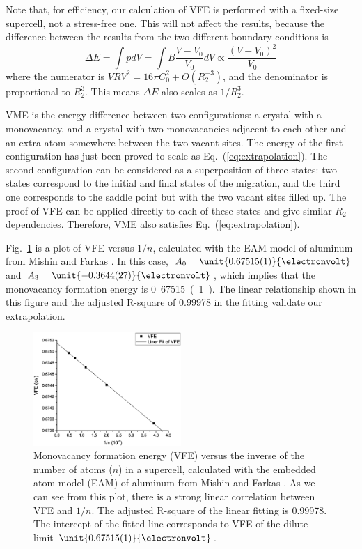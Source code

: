 \documentclass[%
 reprint,
 amsmath,amssymb,
 aps,
]{revtex4-1}
\begin{document}
Note that, for efficiency, our calculation of VFE is performed with a fixed-size supercell, not a stress-free one.
This will not affect the results, because the difference between the results from the two different boundary conditions is
\begin{equation}
\Delta E=\int pdV=\int B \frac{V-V_0}{V_0}dV\propto\frac{(V-V_0)^2}{V_0}
\end{equation}
where the numerator is $\mathit{VRV}^2=16\pi C_0^2+O(R_2^{-3})$, and the denominator is proportional to $R_2^3$.
This means $\Delta E$ also scales as $1/R_2^3$.

VME is the energy difference between two configurations:
a crystal with a monovacancy, and a crystal with two monovacancies adjacent to each other and an extra atom somewhere between the two vacant sites.
The energy of the first configuration has just been proved to scale as Eq.~(\ref{eq:extrapolation}).
The second configuration can be considered as a superposition of three states:
two states correspond to the initial and final states of the migration, and the third one corresponds to the saddle point but with the two vacant sites filled up.
The proof of VFE can be applied directly to each of these states and give similar $R_2$ dependencies.
Therefore, VME also satisfies Eq.~(\ref{eq:extrapolation}).

Fig.~\ref{fig:VFEFitting} is a plot of VFE versus $1/n$, calculated with the EAM model of aluminum from Mishin and Farkas \cite{mishin1999interatomic}.
In this case, $A_0 = \unit{0.67515(1)}{\electronvolt}$ and $A_3 = \unit{-0.3644(27)}{\electronvolt}$, which implies that the monovacancy formation energy is \unit{0.67515(1)}{\electronvolt}.
The linear relationship shown in this figure and the adjusted R-square of 0.99978 in the fitting validate our extrapolation.
\begin{figure}
\includegraphics[width=0.5\textwidth]{AlMishinVFEFitting}%
\caption{\label{fig:VFEFitting}
  Monovacancy formation energy (VFE) versus the inverse of the number of atoms ($n$) in a supercell, calculated with the embedded atom model (EAM) of aluminum from Mishin and Farkas \cite{mishin1999interatomic}.
  As we can see from this plot, there is a strong linear correlation between VFE and $1/n$.
  The adjusted R-square of the linear fitting is 0.99978.
  The intercept of the fitted line corresponds to VFE of the dilute limit $\unit{0.67515(1)}{\electronvolt}$.
}
\end{figure}
\end{document}
